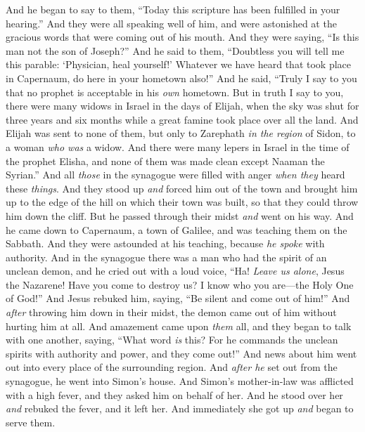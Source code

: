 \begin{biblechapter}
\verse And he began to say to them, “Today this scripture has been fulfilled in your hearing.”
\verse And they were all speaking well of him, and were astonished at the gracious words that were coming out of his mouth. And they were saying, “Is this man not the son of Joseph?”
\verse And he said to them, “Doubtless you will tell me this parable: ‘Physician, heal yourself!’ Whatever we have heard that took place in Capernaum, do here in your hometown also!”
\verse And he said, “Truly I say to you that no prophet is acceptable in his \textit{own} hometown.
\verse But in truth I say to you, there were many widows in Israel in the days of Elijah, when the sky was shut for three years and six months while a great famine took place over all the land.
\verse And Elijah was sent to none of them, but only to Zarephath \textit{in the region} of Sidon, to a woman \textit{who was} a widow.
\verse And there were many lepers in Israel in the time of the prophet Elisha, and none of them was made clean except Naaman the Syrian.”
\verse And all \textit{those} in the synagogue were filled with anger \textit{when they} heard these \textit{things}.
\verse And they stood up \textit{and} forced him out of the town and brought him up to the edge of the hill on which their town was built, so that they could throw him down the cliff.
\verse But he passed through their midst \textit{and} went on his way.
 And he came down to Capernaum, a town of Galilee, and was teaching them on the Sabbath.
\verse And they were astounded at his teaching, because \textit{he spoke} with authority.
\verse And in the synagogue there was a man who had the spirit of an unclean demon, and he cried out with a loud voice,
\verse “Ha! \textit{Leave us alone}, Jesus the Nazarene! Have you come to destroy us? I know who you are—the Holy One of God!”
\verse And Jesus rebuked him, saying, “Be silent and come out of him!” And \textit{after} throwing him down in their midst, the demon came out of him without hurting him at all.
\verse And amazement came upon \textit{them} all, and they began to talk with one another, saying, “What word \textit{is} this? For he commands the unclean spirits with authority and power, and they come out!”
\verse And news about him went out into every place of the surrounding region.
\verse And \textit{after he} set out from the synagogue, he went into Simon’s house. And Simon’s mother-in-law was afflicted with a high fever, and they asked him on behalf of her.
\verse And he stood over her \textit{and} rebuked the fever, and it left her. And immediately she got up \textit{and} began to serve them.

\end{biblechapter}
